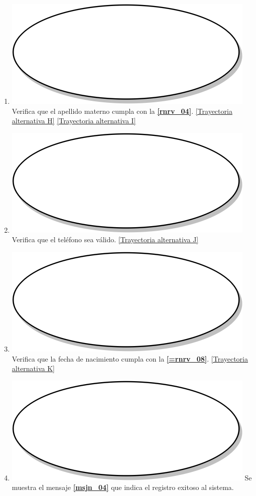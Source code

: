 \begin{enumerate}
  \item {\includegraphics[scale=.05]{Capitulo3/img/proceso.png} Verifica que el apellido materno cumpla con la \textbf{\ref{rnrv_04}}. \hyperref[cu2_ta_h]{[Trayectoria alternativa H]} \hyperref[cu2_ta_i]{[Trayectoria alternativa I]}}
  \item {\includegraphics[scale=.05]{Capitulo3/img/proceso.png} Verifica que el teléfono sea válido. \hyperref[cu2_ta_j]{[Trayectoria alternativa J]}}
  \item {\includegraphics[scale=.05]{Capitulo3/img/proceso.png} Verifica que la fecha de nacimiento cumpla con la \textbf{\ref{=rnrv_08}}. \hyperref[cu2_ta_k]{[Trayectoria alternativa K]}}
  \item {\includegraphics[scale=.05]{Capitulo3/img/proceso.png} Se muestra el mensaje \textbf{\ref{msjn_04}} que indica el registro exitoso al sistema.}

\end{enumerate}
